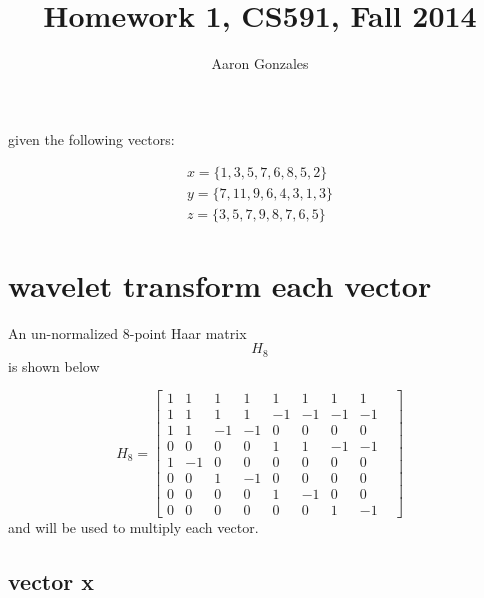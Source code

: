 \documentclass{article}
\begin{document}
\title{Homework 1, CS591, Fall 2014}
\author{Aaron Gonzales}
\maketitle


given the following vectors:

\begin{align}
	x = \{1, 3, 5, 7, 6, 8, 5, 2\}  \\
	y = \{7, 11, 9, 6, 4, 3, 1, 3\}  \\
	z = \{3, 5, 7, 9, 8, 7, 6, 5\}  
\end{align}

\section{wavelet transform each vector}

An un-normalized 8-point Haar matrix \[H_8\] is shown below

\[ H_{8} =  
\begin{bmatrix} 
	1&1&1&1&1&1&1&1 \\ 
	1&1&1&1&-1&-1&-1&-1 \\
	1&1&-1&-1&0&0&0&0& \\ 
	0&0&0&0&1&1&-1&-1 \\ 
	1&-1&0&0&0&0&0&0& \\
	0&0&1&-1&0&0&0&0 \\ 
	0&0&0&0&1&-1&0&0& \\ 
	0&0&0&0&0&0&1&-1 
\end{bmatrix}
\]
and will be used to multiply each vector.

\subsection{vector x}
\end{document}
